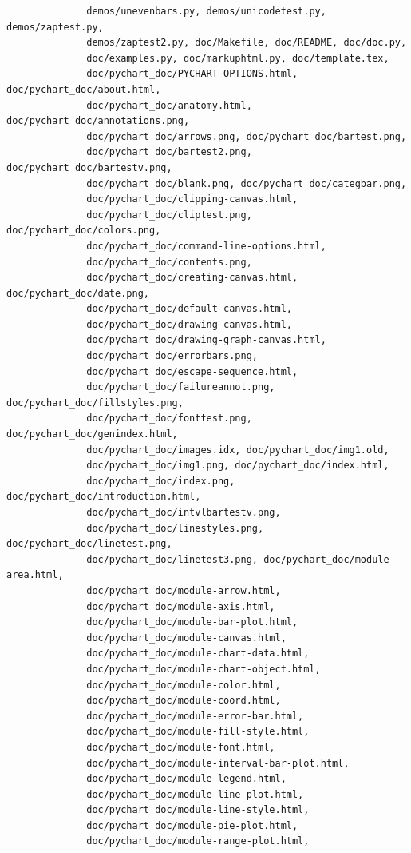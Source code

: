\documentclass[a4paper]{article}
\begin{document}
\begin{verbatim}
              demos/unevenbars.py, demos/unicodetest.py, demos/zaptest.py,
              demos/zaptest2.py, doc/Makefile, doc/README, doc/doc.py,
              doc/examples.py, doc/markuphtml.py, doc/template.tex,
              doc/pychart_doc/PYCHART-OPTIONS.html, doc/pychart_doc/about.html,
              doc/pychart_doc/anatomy.html, doc/pychart_doc/annotations.png,
              doc/pychart_doc/arrows.png, doc/pychart_doc/bartest.png,
              doc/pychart_doc/bartest2.png, doc/pychart_doc/bartestv.png,
              doc/pychart_doc/blank.png, doc/pychart_doc/categbar.png,
              doc/pychart_doc/clipping-canvas.html,
              doc/pychart_doc/cliptest.png, doc/pychart_doc/colors.png,
              doc/pychart_doc/command-line-options.html,
              doc/pychart_doc/contents.png,
              doc/pychart_doc/creating-canvas.html, doc/pychart_doc/date.png,
              doc/pychart_doc/default-canvas.html,
              doc/pychart_doc/drawing-canvas.html,
              doc/pychart_doc/drawing-graph-canvas.html,
              doc/pychart_doc/errorbars.png,
              doc/pychart_doc/escape-sequence.html,
              doc/pychart_doc/failureannot.png, doc/pychart_doc/fillstyles.png,
              doc/pychart_doc/fonttest.png, doc/pychart_doc/genindex.html,
              doc/pychart_doc/images.idx, doc/pychart_doc/img1.old,
              doc/pychart_doc/img1.png, doc/pychart_doc/index.html,
              doc/pychart_doc/index.png, doc/pychart_doc/introduction.html,
              doc/pychart_doc/intvlbartestv.png,
              doc/pychart_doc/linestyles.png, doc/pychart_doc/linetest.png,
              doc/pychart_doc/linetest3.png, doc/pychart_doc/module-area.html,
              doc/pychart_doc/module-arrow.html,
              doc/pychart_doc/module-axis.html,
              doc/pychart_doc/module-bar-plot.html,
              doc/pychart_doc/module-canvas.html,
              doc/pychart_doc/module-chart-data.html,
              doc/pychart_doc/module-chart-object.html,
              doc/pychart_doc/module-color.html,
              doc/pychart_doc/module-coord.html,
              doc/pychart_doc/module-error-bar.html,
              doc/pychart_doc/module-fill-style.html,
              doc/pychart_doc/module-font.html,
              doc/pychart_doc/module-interval-bar-plot.html,
              doc/pychart_doc/module-legend.html,
              doc/pychart_doc/module-line-plot.html,
              doc/pychart_doc/module-line-style.html,
              doc/pychart_doc/module-pie-plot.html,
              doc/pychart_doc/module-range-plot.html,

\end{verbatim}
\end{document}
